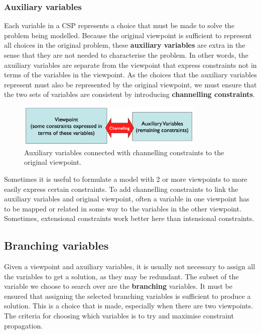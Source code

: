 \documentclass[CS4402-Notes.tex]{subfiles}
\begin{document}
\subsubsection{Auxiliary variables}
Each variable in a CSP represents a choice that must be made to solve the problem being modelled. Because the original viewpoint is sufficient to represent all choices in the original problem, these \textbf{auxiliary variables} are extra in the sense that they are not needed to characterise the problem. In other words, the axuiliary variables are separate from the viewpoint that express constraints not in terms of the variables in the viewpoint.
\n
As the choices that the auxiliary variables represent must also be represented by the original viewpoint, we must ensure that the two sets of variables are consistent by introducing \textbf{channelling constraints}.
\begin{figure}[H]
\centering
\includegraphics[width=0.8\textwidth]{imgs/channelling-constraints.png}
\caption{Auxiliary variables connected with channelling constraints to the original viewpoint.}
\end{figure}
\noindent
Sometimes it is useful to formulate a model with 2 or more viewpoints to more easily express certain constraints. To add channelling constraints to link the auxiliary variables and original viewpoint, often a variable in one viewpoint has to be mapped or related in some way to the variables in the other viewpoint. Sometimes, extensional constraints work better here than intensional constraints.

\subsection{Branching variables}
Given a viewpoint and axuiliary variables, it is usually not necessary to assign all the variables to get a solution, as they may be redundant. The subset of the variable we choose to search over are the \textbf{branching} variables. It must be ensured that assigning the selected branching variables is sufficient to produce a solution. This is a choice that is made, especially when there are two viewpoints. The criteria for choosing which variables is to try and maximise constraint propagation.
\end{document}
